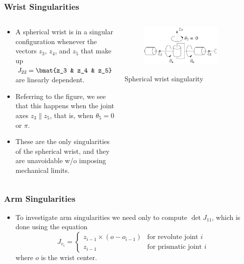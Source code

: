 \begin{frame}
    \frametitle{Wrist Singularities}

    \begin{columns}
        \begin{column}{0.6\textwidth}
            \begin{itemize}
                \item A spherical wrist is in a singular configuration whenever the
                vectors $z_3$, $z_4$, and $z_5$ that make up $J_{22} = \bmat{z_3 & z_4 &
                z_5}$ are linearly dependent.
                \item Referring to the figure, we see that this happens when the 
                joint axes $z_3 \parallel z_5$, that is, when $\theta_5 = 0$ or $\pi$.
                \item These are the only singularities of the spherical wrist, and 
                they are unavoidable w/o imposing mechanical limits.
            \end{itemize}
        \end{column}
        \begin{column}{0.4\textwidth}
            \begin{figure}[bth]
                \centering
                \includegraphics[width=0.85\textwidth]{figures/spherical_wrist_singularity.png} 
            \end{figure}
            \vspace{-2mm}
            \centering
            \footnotesize{Spherical wrist singularity}
        \end{column}
    \end{columns}
\end{frame}



\begin{frame}
    \frametitle{Arm Singularities}

    \begin{itemize}
        \item To investigate arm singularities we need only to compute $\det
        J_{11}$, which is done using the equation
        \[ J_{v_i} = 
        \begin{cases}
            z_{i-1} \times (o - o_{i-1}) & \mbox{for revolute joint $i$} \\
            z_{i-1} & \mbox{for prismatic joint $i$}
        \end{cases}    
        \]
        where $o$ is the wrist center.
    \end{itemize}
\end{frame}


